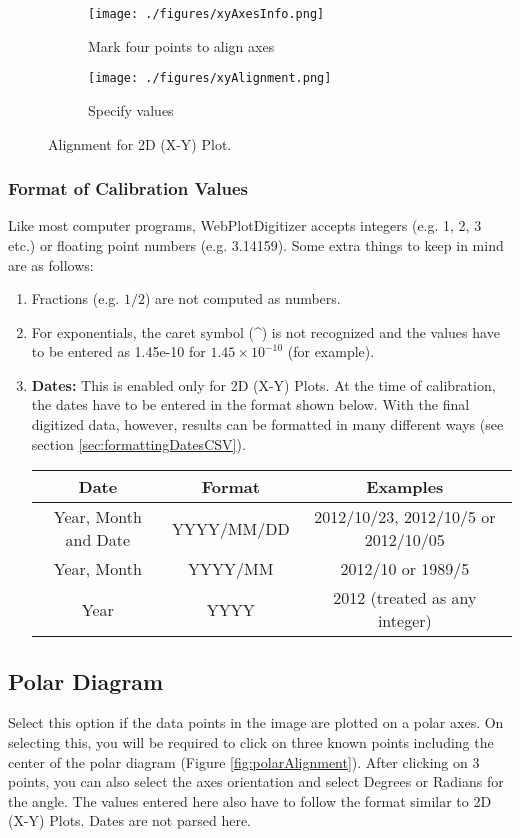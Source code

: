\documentclass[letterpaper, 10pt]{article}
\begin{document}
\begin{figure}
\centering
{\begin{subfigure}[b]{0.4\textwidth}
\texttt{[image: ./figures/xyAxesInfo.png]}
\caption{Mark four points to align axes}
\end{subfigure}
\begin{subfigure}[b]{0.4\textwidth}
\texttt{[image: ./figures/xyAlignment.png]}
\caption{Specify values}
\end{subfigure}}
\caption{Alignment for 2D (X-Y) Plot.}
\label{fig:xyAlignment}
\end{figure}

\subsubsection{Format of Calibration Values}
\label{sec:formattingInput}
Like most computer programs, WebPlotDigitizer accepts integers (e.g. 1, 2, 3 etc.) or floating point numbers (e.g. 3.14159). Some extra things to keep in mind are as follows:
\begin{enumerate}
\item{Fractions (e.g. $1/2$) are not computed as numbers.}
\item{For exponentials, the caret symbol (\^{}) is not recognized and the values have to be entered as 1.45e-10 for $1.45 \times 10^{-10}$ (for example).}
\item{{\bf Dates:} This is enabled only for 2D (X-Y) Plots. At the time of calibration, the dates have to be entered in the format shown below. With the final digitized data, however, results can be formatted in many different ways (see section \ref{sec:formattingDatesCSV}).
\begin{center}
\begin{tabular}{|c|c|c|}
\hline
Date & Format & Examples\\
\hline
Year, Month and Date & YYYY/MM/DD & 2012/10/23, 2012/10/5 or 2012/10/05\\
Year, Month & YYYY/MM & 2012/10 or 1989/5\\
Year & YYYY & 2012 (treated as any integer)\\
\hline
\end{tabular}
\end{center}
}
\end{enumerate}





\subsection{Polar Diagram}
Select this option if the data points in the image are plotted on a polar axes. On selecting this, you will be required to click on three known points including the center of the polar diagram (Figure \ref{fig:polarAlignment}). After clicking on 3 points, you can also select the axes orientation and select Degrees or Radians for the angle. The values entered here also have to follow the format similar to 2D (X-Y) Plots. Dates are not parsed here.
\end{document}
